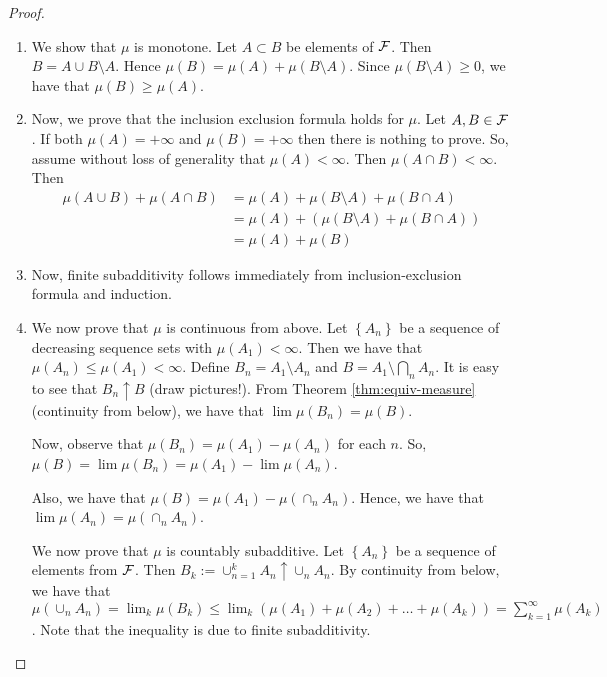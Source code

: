 \begin{proof}
    \begin{enumerate}[label=(\arabic*)]
        \item We show that $\mu$ is monotone. Let $A \subset B$ be elements of ${\cal F}$. Then $B=A\cup B\setminus A$. Hence $\mu (B) = \mu (A) + \mu (B\setminus A)$. Since $\mu (B\setminus A ) \ge 0$, we have that $\mu (B) \ge \mu (A)$. 

        \item Now, we prove that the inclusion exclusion formula holds for $\mu$. Let $A, B\in {\cal F}$. If both $\mu(A) = +\infty$ and $\mu (B) = + \infty$ then there is nothing to prove. So, assume without loss of generality that $\mu (A) < \infty$. Then $\mu (A \cap B) < \infty$.  Then
        \begin{align*}
	        \mu (A \cup B) + \mu (A\cap B) &= \mu (A) + \mu (B \setminus A) + \mu (B\cap A)  \\
	        &= \mu (A) + (\mu (B \setminus A) + \mu (B\cap A))  \\
	        &= \mu (A) + \mu (B)
        \end{align*}

        \item Now, finite subadditivity follows immediately from inclusion-exclusion formula and induction.

        \item We now prove that $\mu$ is continuous from above. Let $\left\{ A_n \right\}$ be a sequence of decreasing sequence sets with $\mu (A_1) < \infty$. Then we have that $\mu (A_n) \le \mu (A_1) < \infty$. Define $B_n = A_1 \setminus A_n$ and $B=A_1 \setminus \bigcap_n A_n$. It is easy to see that $B_n \uparrow B$ (draw pictures!). From Theorem \ref{thm:equiv-measure} (continuity from below), we have that $\lim \mu (B_n ) = \mu (B)$.   

        Now, observe that $\mu (B_n ) = \mu (A_1) - \mu (A_n )$ for each $n$. So, $\mu (B) = \lim \mu (B_n) = \mu (A_1) - \lim \mu (A_n)$. 

        Also, we have that $\mu (B) = \mu (A_1) - \mu (\cap_n A_n )$. Hence, we have that $\lim \mu (A_n ) = \mu \left( \cap_n A_n \right)$. 

        We now prove that $\mu$ is countably subadditive. Let $\left\{ A_n \right\}$ be a sequence of elements from ${\cal F}$. Then $B_k := \cup_{n=1}^{k} A_n \uparrow \cup_{n} A_n$. By continuity from below, we have that $\mu \left( \cup_n A_n \right) = \lim_k \mu (B_k) \le \lim_k \left( \mu (A_1) + \mu (A_2) + \ldots + \mu (A_k) \right)= \sum_{k=1}^{\infty} \mu (A_k)$. Note that the inequality is due to finite subadditivity.
    \end{enumerate}
\end{proof}

